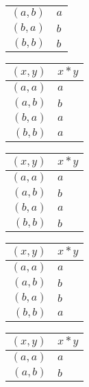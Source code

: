 \begin{enumerate}[label={\Alph*.},font={\bfseries}]
\begin{enumerate}[label={\arabic*},font={\bfseries}]
\begin{minipage}[h]{.25\textwidth}
\begin{tabular}{ r | l }
            $(a,b)$ & $a$ \\
            $(b,a)$ & $b$ \\
            $(b,b)$ & $b$
          \end{tabular}
        \end{minipage}
        \begin{minipage}[h]{.25\textwidth}
          \begin{tabular}{ r | l }
            $(x,y)$ & $x*y$ \\
            \hline
            $(a,a)$ & $a$ \\
            $(a,b)$ & $b$ \\
            $(b,a)$ & $a$ \\
            $(b,b)$ & $a$
          \end{tabular}
        \end{minipage}
        \begin{minipage}[h]{.25\textwidth}
          \begin{tabular}{ r | l }
            $(x,y)$ & $x*y$ \\
            \hline
            $(a,a)$ & $a$ \\
            $(a,b)$ & $b$ \\
            $(b,a)$ & $a$ \\
            $(b,b)$ & $b$
          \end{tabular}
        \end{minipage}
        \begin{minipage}[h]{.25\textwidth}
          \begin{tabular}{ r | l }
            $(x,y)$ & $x*y$ \\
            \hline
            $(a,a)$ & $a$ \\
            $(a,b)$ & $b$ \\
            $(b,a)$ & $b$ \\
            $(b,b)$ & $a$
          \end{tabular}
        \end{minipage}
        \begin{minipage}[h]{.25\textwidth}
          \begin{tabular}{ r | l }
            $(x,y)$ & $x*y$ \\
            \hline
            $(a,a)$ & $a$ \\
            $(a,b)$ & $b$ \\

\end{tabular}
\end{minipage}
\end{enumerate}
\end{enumerate}
